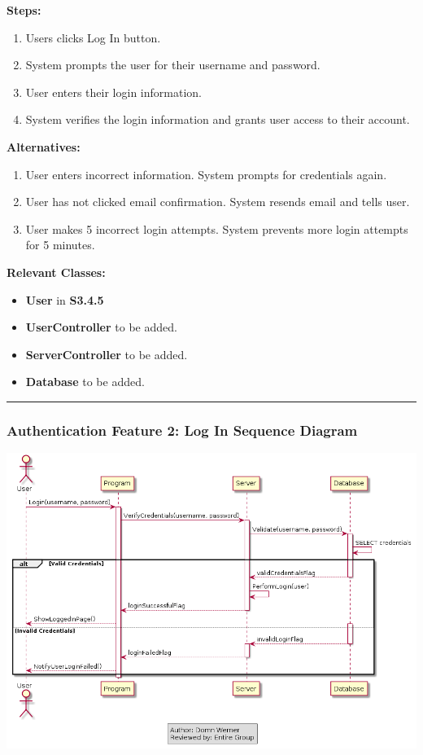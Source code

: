 \documentclass[twoside,letterpaper]{article}
\begin{document}
\noindent\textbf{Steps:}
\begin{enumerate}
	\item Users clicks Log In button.
	\item System prompts the user for their username and password.
	\item User enters their login information.
	\item System verifies the login information and grants user access to their account.
\end{enumerate}
\noindent\textbf{Alternatives:}
	\begin{enumerate}
		\item User enters incorrect information. System prompts for credentials again.
		\item User has not clicked email confirmation. System resends email and tells user.
		\item User makes 5 incorrect login attempts. System prevents more login attempts for 5 minutes.
	\end{enumerate}

\noindent\textbf{Relevant Classes:}
\begin{itemize}
	\item \textbf{User} in \textbf{S3.4.5}
	\item \textbf{UserController} to be added.
	\item \textbf{ServerController} to be added.
	\item \textbf{Database} to be added.
\end{itemize}
\vspace{8pt}
\hrule
\newpage

\subsubsection[Authentication Feature 2: Log In Sequence Diagram]{\rmfamily\bfseries\color{black}
	Authentication Feature 2: Log In Sequence Diagram}
\hypertarget{RefHeading22059017292}{}

\bigskip

\includegraphics[width=\textwidth]{images/SequenceDiagrams/AuthenticationLogIn}
\end{document}

